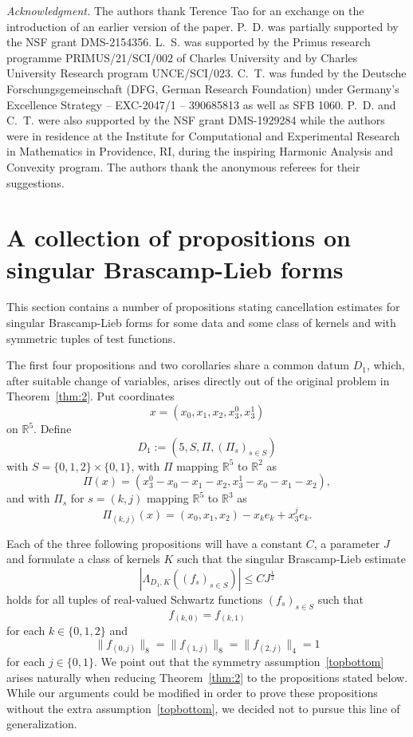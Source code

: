 \documentclass[12pt,reqno]{amsart}
\theoremstyle{plain}
\theoremstyle{definition}
\numberwithin{equation}{section}
\newcommand{\R}{{\mathbb R}}
\begin{document}
 \textit{Acknowledgment.} 
The authors thank Terence Tao for an exchange on the introduction of an earlier version of the paper.
 P.~D.  was partially supported by the NSF grant DMS-2154356. L.~S. was supported by the Primus research programme PRIMUS/21/SCI/002 of Charles University and by Charles University Research program
UNCE/SCI/023. 
C.~T. was funded by the Deutsche Forschungsgemeinschaft (DFG, German Research Foundation) under Germany's Excellence Strategy -- EXC-2047/1 -- 390685813 as well as SFB 1060.
P.~D. and C.~T. were also supported by the NSF grant DMS-1929284 while the authors were in residence at the Institute for Computational and Experimental Research in Mathematics in Providence, RI, during the inspiring Harmonic Analysis and Convexity program.   The authors thank the anonymous referees for their suggestions.

\section{A collection of propositions on singular Brascamp-Lieb forms}
\label{sblsection}
This section contains a number of propositions stating cancellation estimates for 
singular Brascamp-Lieb forms for some data and some 
class of kernels and  with symmetric tuples of test functions. 

The first four propositions and two corollaries share a common datum $D_1$, which, 
after suitable change of variables, arises directly out of the original problem in Theorem~\ref{thm:2}.
Put coordinates \[x=(x_0,x_1,x_2,x_3^0,x_3^1)\] on $\R^5$.
Define 
\begin{equation}\label{defd1}
D_1:=(5,S, \Pi,(\Pi_s)_{s\in S})    
\end{equation}
 with 
$S=\{0,1,2\}\times \{0,1\}$, with $\Pi$ mapping $\R^5$ to $\R^2$ 
as
\[\Pi(x)=(x_3^0-x_0-x_1-x_2, x_3^1-x_0-x_1-x_2),\]
and with $\Pi_s$ for $s=(k,j)$ mapping $\R^5$ to $\R^3$ as
\[\Pi_{(k,j)}(x)=(x_0,x_1,x_2)-x_ke_k+ x_3^j e_k.\]

Each of the three following propositions will have a constant $C$, a 
parameter $J$ and formulate a class of kernels $K$ such that the 
singular Brascamp-Lieb estimate 
\begin{equation}\label{lambdabd}
|\Lambda_{D_1,K} ((f_s)_{s\in S})|\le CJ^{\frac 12}
\end{equation}
holds for all tuples of real-valued Schwartz functions $(f_{s})_{s\in S}$
such that
\begin{equation}\label{topbottom}
f_{(k,0)}=f_{(k,1)}
\end{equation}
for each $k\in \{0,1,2\}$
and 
\begin{equation}\label{normal1}
\|f_{(0,j)}\|_{8}=\|f_{(1,j)}\|_{8} =\|f_{(2,j)}\|_{4} =1
\end{equation}
for each $j\in \{0,1\}$.  We point out that the symmetry assumption~\eqref{topbottom} arises naturally when reducing Theorem~\ref{thm:2} to the propositions stated below. While our arguments could be modified in order to prove these propositions without the extra assumption~\eqref{topbottom}, we decided not to pursue this line of generalization.
\end{document}
